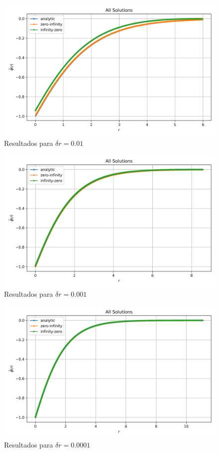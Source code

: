 \documentclass[12pt, a4paper]{article} %
\begin{document}
        \begin{figure}[H]
            \centering
            \includegraphics[scale=0.7]{../images/all-plots-0.01.png}
            \caption{Resultados para $\delta r = 0.01$}
            \label{fig:all-plots-0.01}
        \end{figure}
        \begin{figure}[H]
            \centering
            \includegraphics[scale=0.7]{../images/all-plots-0.001.png}
            \caption{Resultados para $\delta r = 0.001$}
            \label{fig:all-plots-0.001}
        \end{figure}
        \begin{figure}[H]
            \centering
            \includegraphics[scale=0.7]{../images/all-plots-0.0001.png}
            \caption{Resultados para $\delta r = 0.0001$}
            \label{fig:all-plots-0.0001}
        \end{figure}
\end{document}

